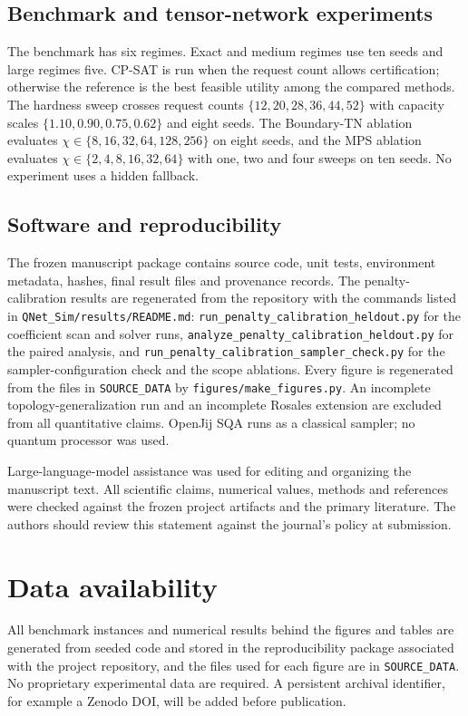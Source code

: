 \documentclass[pdflatex,sn-nature]{sn-jnl}
\theoremstyle{plain}
\theoremstyle{remark}
\begin{document}
\subsection{Benchmark and tensor-network experiments}

The benchmark has six regimes. Exact and medium regimes use ten seeds and large regimes five. CP-SAT is run when the request count allows certification; otherwise the reference is the best feasible utility among the compared methods. The hardness sweep crosses request counts $\{12,20,28,36,44,52\}$ with capacity scales $\{1.10,0.90,0.75,0.62\}$ and eight seeds. The Boundary-TN ablation evaluates $\chi\in\{8,16,32,64,128,256\}$ on eight seeds, and the MPS ablation evaluates $\chi\in\{2,4,8,16,32,64\}$ with one, two and four sweeps on ten seeds. No experiment uses a hidden fallback.

\subsection{Software and reproducibility}

The frozen manuscript package contains source code, unit tests, environment metadata, hashes, final result files and provenance records. The penalty-calibration results are regenerated from the repository with the commands listed in \texttt{QNet\_Sim/results/README.md}: \texttt{run\_penalty\_calibration\_heldout.py} for the coefficient scan and solver runs, \texttt{analyze\_penalty\_calibration\_heldout.py} for the paired analysis, and \texttt{run\_penalty\_calibration\_sampler\_check.py} for the sampler-configuration check and the scope ablations. Every figure is regenerated from the files in \texttt{SOURCE\_DATA} by \texttt{figures/make\_figures.py}. An incomplete topology-generalization run and an incomplete Rosales extension are excluded from all quantitative claims. OpenJij SQA runs as a classical sampler; no quantum processor was used.

Large-language-model assistance was used for editing and organizing the manuscript text. All scientific claims, numerical values, methods and references were checked against the frozen project artifacts and the primary literature. The authors should review this statement against the journal's policy at submission.

\section{Data availability}
All benchmark instances and numerical results behind the figures and tables are generated from seeded code and stored in the reproducibility package associated with the project repository, and the files used for each figure are in \texttt{SOURCE\_DATA}. No proprietary experimental data are required. A persistent archival identifier, for example a Zenodo DOI, will be added before publication.
\end{document}
